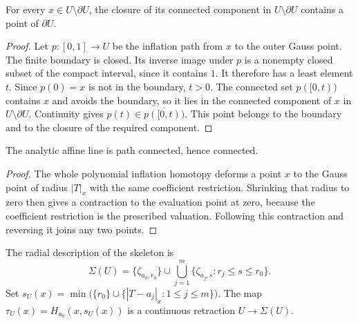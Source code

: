 \begin{lemma}\label{lem:fc-standard-component-boundary}
\leanok
For every $x\in U\setminus\partial U$, the closure of its connected
component in $U\setminus\partial U$ contains a point of $\partial U$.
\end{lemma}

\begin{proof}
Let $p\colon[0,1]\to U$ be the inflation path from $x$ to the outer Gauss
point. The finite boundary is closed. Its inverse image under $p$ is a
nonempty closed subset of the compact interval, since it contains $1$.
It therefore has a least element $t$. Since $p(0)=x$ is not in the boundary,
$t>0$. The connected set $p([0,t))$ contains $x$ and avoids the boundary,
so it lies in the connected component of $x$ in $U\setminus\partial U$.
Continuity gives $p(t)\in\overline{p([0,t))}$. This point belongs to the
boundary and to the closure of the required component.
\end{proof}

\begin{corollary}\label{cor:fc-line-paths}
\leanok
The analytic affine line is path connected, hence connected.
\end{corollary}

\begin{proof}
The whole polynomial inflation homotopy deforms a point $x$ to the Gauss
point of radius $|T|_x$ with the same coefficient restriction. Shrinking that
radius to zero then gives a contraction to the evaluation point at zero,
because the coefficient restriction is the prescribed valuation. Following
this contraction and reversing it joins any two points.
\end{proof}

\begin{lemma}\label{lem:fc-skeleton-retraction}
\leanok
{}
The radial description of the skeleton is
\[
 \Sigma(U)=\{\zeta_{a_0,r_0}\}\cup
 \bigcup_{j=1}^m\{\zeta_{a_j,s}:r_j\le s\le r_0\}.
\]
Set $s_U(x)=\min\bigl(\{r_0\}\cup\{|T-a_j|_x:1\le j\le m\}\bigr)$.
The map $\tau_U(x)=H_{a_0}(x,s_U(x))$ is a continuous retraction
$U\to\Sigma(U)$.
\end{lemma}

